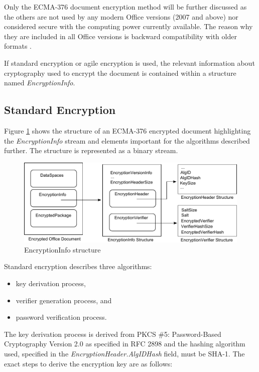 \documentclass[11pt,oneside]{fithesis2}
\begin{document}
Only the ECMA-376 document encryption method will be further discussed as the others are not used by any modern Office versions (2007 and above) nor considered secure with the computing power currently available. The reason why they are included in all Office versions is backward compatibility with older formats \cite{msoffcrypto}.

If standard encryption or agile encryption is used, the relevant information about cryptography used to encrypt the document is contained within a structure named \textit{EncryptionInfo}.

\subsection{Standard Encryption} \label{msoff_standard_enc}

Figure \ref{keys_length} shows the structure of an ECMA-376 encrypted document highlighting the \textit{EncryptionInfo} stream and elements important for the algorithms described further. The structure is represented as a binary stream.

\begin{figure}[ht]
	\centering
	\includegraphics[width=1\textwidth]{figures/ei_struct.pdf}
	\caption{EncryptionInfo structure}
	\label{keys_length}
\end{figure}

Standard encryption describes three algorithms:
\begin{itemize}
	\setlength\itemsep{0.1em}
	\item{key derivation process,}
	\item{verifier generation process, and}
	\item{password verification process.}
\end{itemize}

The key derivation process is derived from PKCS \#5: Password-Based Cryptography Version 2.0 as specified in RFC 2898 \cite{rfc2898} and the hashing algorithm used, specified in the \textit{EncryptionHeader.AlgIDHash} field, must be SHA-1. The exact steps to derive the encryption key are as follows:
\end{document}
